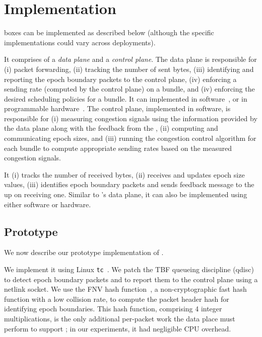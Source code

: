 \section{Implementation}\label{s:impl}
\name boxes can be implemented as described below (although the specific implementations could vary across deployments).

\Para{\capinbox} It comprises of a \emph{data plane} and a \emph{control plane}. The data plane is responsible for (i) packet forwarding, (ii) tracking the number of sent bytes, (iii) identifying and reporting the epoch boundary packets to the control plane, (iv) enforcing a sending rate (computed by the control plane) on a bundle, and (iv) enforcing the desired scheduling policies for a bundle. 
It can implemented in software~\cite{bess, click, netbricks, tc}, or in programmable hardware~\cite{p4}. 
The control plane, implemented in software, is responsible for (i) measuring congestion signals using the information provided by the data plane along with the feedback from the \outbox, (ii) computing and communicating epoch sizes, and (iii) running the congestion control algorithm for each bundle to compute appropriate sending rates based on the measured congestion signals.

\Para{\capoutbox} It (i) tracks the number of received bytes, (ii) receives and updates epoch size values, (iii) identifies epoch boundary packets and sends feedback message to the \inbox up on receiving one. Similar to \inbox's data plane, it can also be implemented using either software or hardware.

\subsection{Prototype}\label{s:impl:prototype}

We now describe our prototype implementation of \name.

 We implement it using Linux \texttt{tc}~\cite{tc}.
We patch the TBF queueing discipline (qdisc)~\cite{tbf} to detect epoch boundary packets and to report them to the control plane using a netlink socket. 
We use the FNV hash function~\cite{fnv-hash}, a non-cryptographic fast hash function with a low collision rate, to compute the packet header hash for identifying epoch boundaries.
This hash function, comprising 4 integer multiplications, is the only additional per-packet work the data place must perform to support \name; in our experiments, it had negligible CPU overhead.

